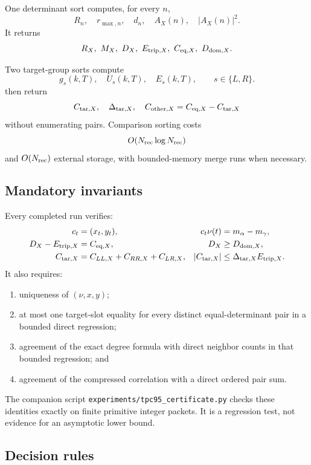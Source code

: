 One determinant sort computes, for every \(n\),
\[
 R_n,\quad r_{\max,n},\quad d_n,\quad A_X(n),\quad |A_X(n)|^2.
\]
It returns
\[
 R_X,\ M_X,\ D_X,\ E_{{\rm trip},X},\
 C_{\mathrm{eq},X},\ D_{\mathrm{dom},X}.
\]

Two target-group sorts compute
\[
 g_s(k,T),\quad U_s(k,T),\quad E_s(k,T),
 \qquad s\in\{L,R\}.
\]
 then return
\[
 C_{\mathrm{tar},X},\quad
 \Delta_{\mathrm{tar},X},\quad
 C_{{\rm other},X}=C_{\mathrm{eq},X}-C_{\mathrm{tar},X}
\]
without enumerating pairs.  Comparison sorting costs
\[
 O(N_{\rm rec}\log N_{\rm rec})
\]
and \(O(N_{\rm rec})\) external storage, with bounded-memory merge
runs when necessary.

\subsection{Mandatory invariants}

Every completed run verifies:
\begin{align}
 c_t&=(x_t,y_t),&
 c_t\nu(t)&=m_\alpha-m_\gamma,\label{eq:census-native-invariants}\\
 D_X-E_{{\rm trip},X}&=C_{\mathrm{eq},X},&
 D_X&\ge D_{\mathrm{dom},X},\label{eq:census-energy-invariants}\\
 C_{\mathrm{tar},X}
 &=C_{LL,X}+C_{RR,X}+C_{LR,X},&
 |C_{\mathrm{tar},X}|&\le\Delta_{\mathrm{tar},X}E_{{\rm trip},X}.
\label{eq:census-target-invariants}
\end{align}
It also requires:

\begin{enumerate}[label=(\roman*),leftmargin=2.2em]
\item uniqueness of \((\nu,x,y)\);
\item at most one target-slot equality for every distinct
  equal-determinant pair in a bounded direct regression;
\item agreement of the exact degree formula with direct neighbor
  counts in that bounded regression; and
\item agreement of the compressed correlation with a direct ordered
  pair sum.
\end{enumerate}

The companion script
\texttt{experiments/tpc95\_certificate.py} checks these identities
exactly on finite primitive integer packets.  It is a regression test,
not evidence for an asymptotic lower bound.

\subsection{Decision rules}

